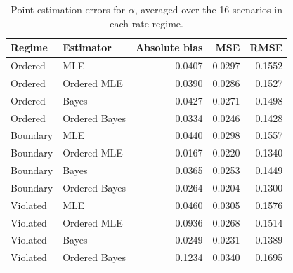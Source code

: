 \begin{table}[htbp]
\centering
\caption{Point-estimation errors for $\alpha$, averaged over the 16 scenarios in each rate regime.}\label{tab:shape}
\small
\begin{tabular}{llrrr}
\toprule
Regime & Estimator & Absolute bias & MSE & RMSE \\
\midrule
Ordered & MLE & 0.0407 & 0.0297 & 0.1552 \\
Ordered & Ordered MLE & 0.0390 & 0.0286 & 0.1527 \\
Ordered & Bayes & 0.0427 & 0.0271 & 0.1498 \\
Ordered & Ordered Bayes & 0.0334 & 0.0246 & 0.1428 \\
Boundary & MLE & 0.0440 & 0.0298 & 0.1557 \\
Boundary & Ordered MLE & 0.0167 & 0.0220 & 0.1340 \\
Boundary & Bayes & 0.0365 & 0.0253 & 0.1449 \\
Boundary & Ordered Bayes & 0.0264 & 0.0204 & 0.1300 \\
Violated & MLE & 0.0460 & 0.0305 & 0.1576 \\
Violated & Ordered MLE & 0.0936 & 0.0268 & 0.1514 \\
Violated & Bayes & 0.0249 & 0.0231 & 0.1389 \\
Violated & Ordered Bayes & 0.1234 & 0.0340 & 0.1695 \\
\bottomrule
\end{tabular}
\end{table}

